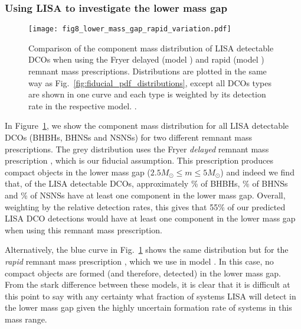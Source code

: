 \subsubsection{Using LISA to investigate the lower mass gap}\label{sec:lower_mass_gap}

\begin{figure}[tb]
    \centering
    \texttt{[image: fig8\_lower\_mass\_gap\_rapid\_variation.pdf]}
    \caption{Comparison of the component mass distribution of LISA detectable DCOs when using the Fryer delayed (model \modFid{}) and rapid (model \modRapid{}) remnant mass prescriptions. Distributions are plotted in the same way as Fig.~\ref{fig:fiducial_pdf_distributions}, except all DCOs types are shown in one curve and each type is weighted by its detection rate in the respective model. \href{https://github.com/TomWagg/detecting-DCOs-in-LISA/blob/main/paper/figures/fig8_lower_mass_gap_rapid_variation.pdf}{\faFileImage} \href{https://github.com/TomWagg/detecting-DCOs-in-LISA/blob/main/paper/figure_notebooks/variations.ipynb}{\faBook}.}
    \label{fig:lower_mass_gap_variation}
\end{figure}

In Figure~\ref{fig:lower_mass_gap_variation}, we show the component mass distribution for all LISA detectable DCOs (BHBHs, BHNSs and NSNSs) for two different remnant mass prescriptions. The grey distribution uses the Fryer \textit{delayed} remnant mass prescription \citep{Fryer+2012}, which is our fiducial assumption. This prescription produces compact objects in the lower mass gap ($2.5 \unit{M_{\odot}} \le m \le 5 \unit{M_{\odot}}$) and indeed we find that, of the LISA detectable DCOs, approximately \BHBHatLeastOneLowerMassGapPerc{}\% of BHBHs, \BHNSatLeastOneLowerMassGapPerc{}\% of BHNSs and \NSNSatLeastOneLowerMassGapPerc{}\% of NSNSs have at least one component in the lower mass gap. Overall, weighting by the relative detection rates, this gives that 55\% of our predicted LISA DCO detections  would have at least one component in the lower mass gap when using this remnant mass prescription.

Alternatively, the blue curve in Fig.~\ref{fig:lower_mass_gap_variation} shows the same distribution but for the \textit{rapid} remnant mass prescription \citep{Fryer+2012}, which we use in model \modRapid{}. In this case, no compact objects are formed (and therefore, detected) in the lower mass gap. From the stark difference between these models, it is clear that it is difficult at this point to say with any certainty what fraction of systems LISA will detect in the lower mass gap given the highly uncertain formation rate of systems in this mass range.

